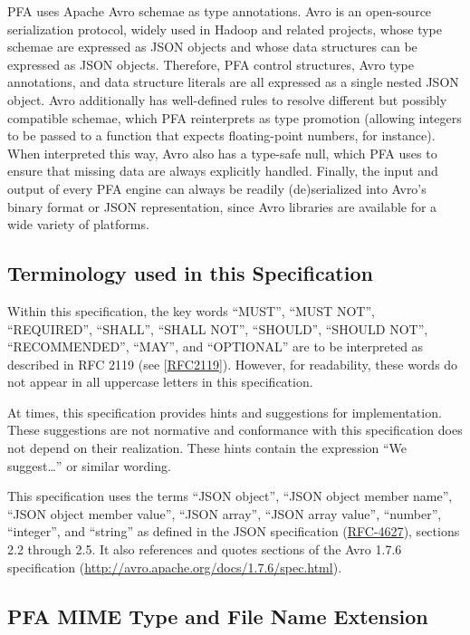 \documentclass{article}
\begin{document}
PFA uses Apache Avro schemae as type annotations.  Avro is an open-source serialization protocol, widely used in Hadoop and related projects, whose type schemae are expressed as JSON objects and whose data structures can be expressed as JSON objects.  Therefore, PFA control structures, Avro type annotations, and data structure literals are all expressed as a single nested JSON object.  Avro additionally has well-defined rules to resolve different but possibly compatible schemae, which PFA reinterprets as type promotion (allowing integers to be passed to a function that expects floating-point numbers, for instance).  When interpreted this way, Avro also has a type-safe null, which PFA uses to ensure that missing data are always explicitly handled.  Finally, the input and output of every PFA engine can always be readily (de)serialized into Avro's binary format or JSON representation, since Avro libraries are available for a wide variety of platforms.

\subsection{Terminology used in this Specification}

Within this specification, the key words ``MUST'', ``MUST NOT'', ``REQUIRED'', ``SHALL'', ``SHALL NOT'', ``SHOULD'', ``SHOULD NOT'', ``RECOMMENDED'', ``MAY'', and ``OPTIONAL'' are to be interpreted as described in RFC 2119 (see [\href{http://www.ietf.org/rfc/rfc2119.txt}{RFC2119}]).  However, for readability, these words do not appear in all uppercase letters in this specification.

At times, this specification provides hints and suggestions for implementation.  These suggestions are not normative and conformance with this specification does not depend on their realization.  These hints contain the expression ``We suggest\ldots'' or similar wording.

This specification uses the terms ``JSON object'', ``JSON object member name'', ``JSON object member value'', ``JSON array'', ``JSON array value'', ``number'', ``integer'', and ``string'' as defined in the JSON specification (\href{http://tools.ietf.org/html/rfc4627}{RFC-4627}), sections 2.2 through 2.5.  It also references and quotes sections of the Avro 1.7.6 specification (\url{http://avro.apache.org/docs/1.7.6/spec.html}).

\subsection{PFA MIME Type and File Name Extension}
\end{document}
